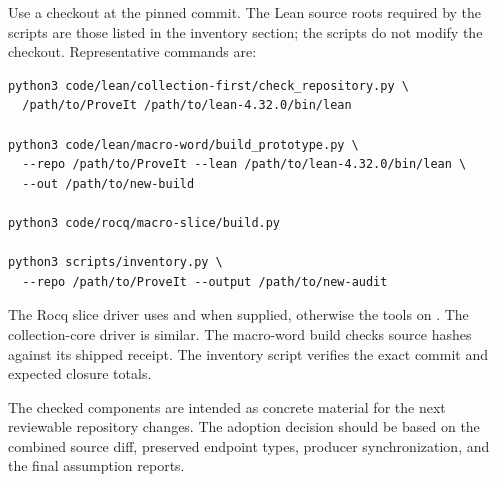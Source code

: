 \documentclass[11pt,letterpaper]{article}
\newcommand{\code}[1]{\texttt{\detokenize{#1}}}
\begin{document}
Use a checkout at the pinned commit. The Lean source roots required by the
scripts are those listed in the inventory section; the scripts do not modify
the checkout. Representative commands are:
\begin{lstlisting}
python3 code/lean/collection-first/check_repository.py \
  /path/to/ProveIt /path/to/lean-4.32.0/bin/lean

python3 code/lean/macro-word/build_prototype.py \
  --repo /path/to/ProveIt --lean /path/to/lean-4.32.0/bin/lean \
  --out /path/to/new-build

python3 code/rocq/macro-slice/build.py

python3 scripts/inventory.py \
  --repo /path/to/ProveIt --output /path/to/new-audit
\end{lstlisting}
The Rocq slice driver uses \code{COQC} and \code{COQCHK} when supplied,
otherwise the tools on \code{PATH}. The collection-core driver is similar.
The macro-word build checks source hashes against its shipped receipt.
The inventory script verifies the exact commit and expected closure totals.

The checked components are intended as concrete material for the next
reviewable repository changes. The adoption decision should be based on
the combined source diff, preserved endpoint types, producer synchronization,
and the final assumption reports.
\end{document}
